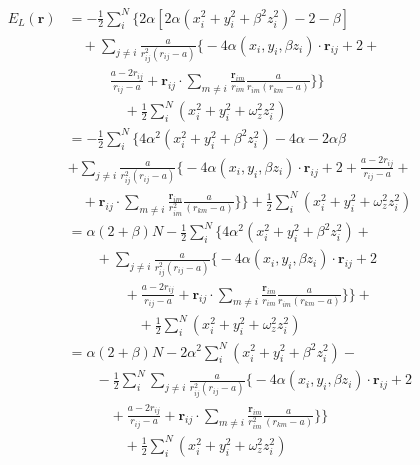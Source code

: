 \begin{align*}
    E_L(\mathbf{r})
    &=-\frac{1}{2} \sum_i^N  \bigg\{ 2 \alpha \left[  2 \alpha (x_i^2 + y_i^2 + \beta^2 z_i^2 ) -2 -\beta \right] \\
    &\quad+ \sum_{j\neq i} \frac{a}{r_{ij}^2 (r_{ij} - a)} \bigg\{ -4 \alpha \left( x_i, y_i, \beta z_i \right) \cdot \mathbf{r}_{ij} + 2 + \\ 
    & \quad \quad \quad \frac{a - 2r_{ij}}{ r_{ij} - a } + \mathbf{r}_{ij} \cdot \sum_{m \neq i}   \frac{\mathbf{r}_{im}}{r_{im}} \frac{a}{r_{im} \left( r_{km} - a \right)} \bigg\} \bigg\} \\
    & \quad\quad\quad\quad+ \frac{1}{2} 
    \sum_i^N (x_i^2 + y_i^2 + \omega_{z}^2 z_i^2) \\
    &= -\frac{1}{2} \sum_i^N  \bigg\{ 4 \alpha^2 (x_i^2 + y_i^2 + \beta^2 z_i^2 ) -4 \alpha - 2\alpha\beta  \\
    &+ \sum_{j\neq i} \frac{a}{r_{ij}^2 (r_{ij} - a)} \bigg\{ -4 \alpha \left( x_i, y_i, \beta z_i \right) \cdot \mathbf{r}_{ij} + 2 + \frac{a - 2r_{ij}}{ r_{ij} - a } + \\
    &\quad + \mathbf{r}_{ij} \cdot \sum_{m \neq i}   \frac{\mathbf{r}_{im}}{r_{im}^2} \frac{a}{ \left( r_{km} - a \right)} \bigg\} \bigg\} + 
    \frac{1}{2} \sum_i^N (x_i^2 + y_i^2 + \omega_{z}^2 z_i^2) \\
    &= \alpha (2 + \beta) N -  \frac{1}{2} \sum_i^N  \bigg\{ 4 \alpha^2 (x_i^2 + y_i^2 + \beta^2 z_i^2 ) + \\ 
    &\quad \quad+\sum_{j\neq i} \frac{a}{r_{ij}^2 (r_{ij} - a)} \bigg\{ -4 \alpha \left( x_i, y_i, \beta z_i \right) \cdot \mathbf{r}_{ij} + 2 \\
    &\quad \quad \quad \quad +\frac{a - 2r_{ij}}{ r_{ij} - a } + \mathbf{r}_{ij} \cdot \sum_{m \neq i}   \frac{\mathbf{r}_{im}}{r_{im}} \frac{a}{r_{im} \left( r_{km} - a \right)} \bigg\} \bigg\} + \\
    &\quad \quad \quad \quad \quad+\frac{1}{2} \sum_i^N (x_i^2 + y_i^2 + \omega_{z}^2 z_i^2) \\
    &= \alpha (2 + \beta) N -  2 \alpha^2 \sum_i^N (x_i^2 + y_i^2 + \beta^2 z_i^2 ) - \\
    &\quad \quad -\frac{1}{2} \sum_i^N \sum_{j\neq i} \frac{a}{r_{ij}^2 (r_{ij} - a)} \bigg\{ -4 \alpha \left( x_i, y_i, \beta z_i \right) \cdot \mathbf{r}_{ij} + 2 \\
    &\quad \quad \quad +\frac{a - 2r_{ij}}{ r_{ij} - a } + \mathbf{r}_{ij} \cdot \sum_{m \neq i}   \frac{\mathbf{r}_{im}}{r_{im}^2} \frac{a}{ \left( r_{km} - a \right)} \bigg\} \bigg\} \\
    &\quad \quad \quad \quad
    +\frac{1}{2} \sum_i^N (x_i^2 + y_i^2 + \omega_{z}^2 z_i^2)\\
\end{align*}
